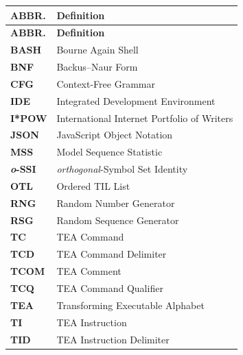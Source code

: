 \documentclass[a4paper, 18pt]{book} %
\begin{document}
\begin{longtable}{p{3cm} p{12cm}}
\textbf{ABBR.} & \textbf{Definition} \\
\hline
\endfirsthead

\textbf{ABBR.} & \textbf{Definition} \\
\hline
\endhead


\textbf{BASH} & Bourne Again Shell \\

\textbf{BNF} & Backus–Naur Form \\

\textbf{CFG} & Context-Free Grammar\\

\textbf{IDE} & Integrated Development Environment\\

\textbf{I*POW} & International Internet Portfolio of Writers \\

\textbf{JSON} & JavaScript Object Notation \\

\textbf{MSS} & Model Sequence Statistic \\

\textbf{\textit{o}-SSI} & \textit{orthogonal}-Symbol Set Identity \\

\textbf{OTL} & Ordered TIL List\\

\textbf{RNG} & Random Number Generator  \\

\textbf{RSG} & Random Sequence Generator  \\

\textbf{TC} & TEA Command \\

\textbf{TCD} & TEA Command Delimiter\\
 
\textbf{TCOM} & TEA Comment\\
 
\textbf{TCQ} & TEA Command Qualifier\\
 
\textbf{TEA} & Transforming Executable Alphabet\\
 
\textbf{TI} & TEA Instruction\\
 
\textbf{TID} & TEA Instruction Delimiter\\
 

\end{longtable}
\end{document}
